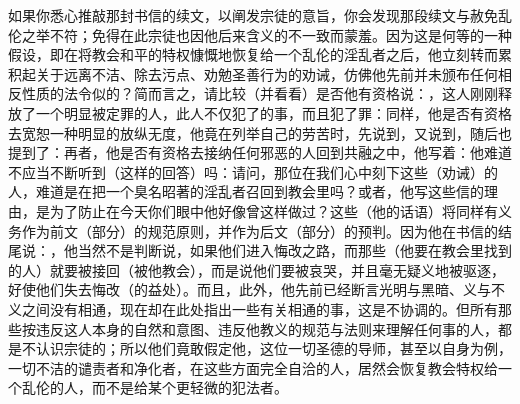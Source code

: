 如果你悉心推敲那封书信的续文，以阐发宗徒的意旨，你会发现那段续文与赦免乱伦之举不符；免得在此宗徒也因他后来含义的不一致而蒙羞。因为这是何等的一种假设，即在将教会和平的特权慷慨地恢复给一个乱伦的淫乱者之后，他立刻转而累积起关于远离不洁、除去污点、劝勉圣善行为的劝诫，仿佛他先前并未颁布任何相反性质的法令似的？简而言之，请比较（并看看）是否他有资格说：，这人刚刚释放了一个明显被定罪的人，此人不仅犯了的事，而且犯了罪：同样，他是否有资格去宽恕一种明显的放纵无度，他竟在列举自己的劳苦时，先说到，又说到，随后也提到了：再者，他是否有资格去接纳任何邪恶的人回到共融之中，他写着：他难道不应当不断听到（这样的回答）吗：请问，那位在我们心中刻下这些（劝诫）的人，难道是在把一个臭名昭著的淫乱者召回到教会里吗？或者，他写这些信的理由，是为了防止在今天你们眼中他好像曾这样做过？这些（他的话语）将同样有义务作为前文（部分）的规范原则，并作为后文（部分）的预判。因为他在书信的结尾说：，他当然不是判断说，如果他们进入悔改之路，而那些（他要在教会里找到的人）就要被接回（被他教会），而是说他们要被哀哭，并且毫无疑义地被驱逐，好使他们失去悔改（的益处）。而且，此外，他先前已经断言光明与黑暗、义与不义之间没有相通，现在却在此处指出一些有关相通的事，这是不协调的。但所有那些按违反这人本身的自然和意图、违反他教义的规范与法则来理解任何事的人，都是不认识宗徒的；所以他们竟敢假定他，这位一切圣德的导师，甚至以自身为例，一切不洁的谴责者和净化者，在这些方面完全自洽的人，居然会恢复教会特权给一个乱伦的人，而不是给某个更轻微的犯法者。\par


